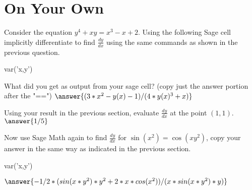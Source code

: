 \documentclass{ximera}
\begin{document}
\section{On Your Own}
Consider the equation $y^4+xy=x^3-x+2$. Using the following Sage cell implicitly differentiate to find $\frac{dy}{dx}$ using the same commands as shown in the previous question.
\begin{onlineOnly}
\begin{sageCell}
var('x,y')
\end{sageCell}
\end{onlineOnly}
\begin{question}
What did you get as output from your sage cell? (copy just the answer portion after the "==") $\answer{(3*x^2 - y(x) - 1)/(4*y(x)^3 + x)}$
\end{question}
\begin{question}
Using your result in the previous section, evaluate $\frac{dy}{dx}$ at the point $(1,1)$.
$\answer{1/5}$
\end{question}
\begin{question}
Now use Sage Math again to find $\frac{dy}{dx}$ for  $\sin(x^2)=\cos(xy^2)$, copy your answer in the same way as indicated in the previous section.
\begin{onlineOnly}
\begin{sageCell}
var('x,y')
\end{sageCell}
\end{onlineOnly}
$\answer{-1/2*(sin(x*y^2)*y^2 + 2*x*cos(x^2))/(x*sin(x*y^2)*y)}$
\end{question}
\end{document}

